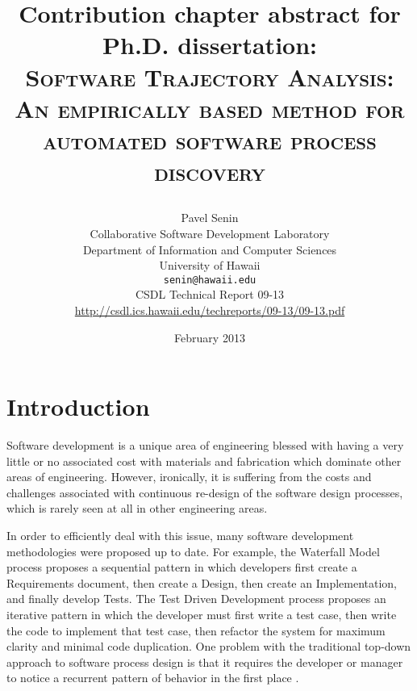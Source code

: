 \documentclass[11pt,oneside]{article}
\begin{document}
\title{Contribution chapter abstract for Ph.D. dissertation: \\
       \textsc{Software Trajectory Analysis:} \\
       \textsc{An empirically based method for automated software process discovery} \\
       \author{Pavel Senin \\
               Collaborative Software Development Laboratory \\
               Department of Information and Computer Sciences \\
               University of Hawaii \\[0.3cm]
               \texttt{senin@hawaii.edu} \\[0.3cm]
               CSDL Technical Report 09-13 \\
               \url{http://csdl.ics.hawaii.edu/techreports/09-13/09-13.pdf}
       }
       \date{February 2013}
}
\maketitle

\clearpage


\section{Introduction}
Software development is a unique area of engineering blessed with having a very little or no 
associated cost with materials and fabrication which dominate other areas of engineering. 
However, ironically, it is suffering from the costs and challenges associated with continuous 
re-design of the software design processes, which is rarely seen at all in other engineering 
areas. 

In order to efficiently deal with this issue, many software development methodologies 
were proposed up to date. For example, the Waterfall Model process proposes a sequential 
pattern in which developers first create a Requirements document, then create a Design, 
then create an Implementation, and finally develop Tests. 
The Test Driven Development process proposes an iterative pattern in which the developer 
must first write a test case, then write the code to implement that test case, then refactor 
the system for maximum clarity and minimal code duplication. One problem with the 
traditional top-down approach to software process design is that it requires
the developer or manager to notice a recurrent pattern of behavior in the first place 
\cite{citeulike:5043104}. 
\end{document}
